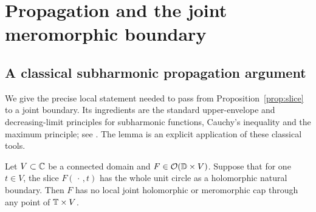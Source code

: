 \section{Propagation and the joint meromorphic boundary}
\label{sec:joint}

\subsection{A classical subharmonic propagation argument}

We give the precise local statement needed to pass from
Proposition~\ref{prop:slice} to a joint boundary. Its ingredients are
the standard upper-envelope and decreasing-limit principles for
subharmonic functions, Cauchy's inequality and the maximum principle;
see \citep[Section 4.8 and Properties 8.4.3]{kw2017}.
The lemma is an explicit application of these classical tools.

\begin{lemma}\label{lem:cap}
Let \(V\subset\mathbb C\) be a connected domain and
\(F\in\mathcal O(\mathbb D\times V)\). Suppose that for one \(t\in V\),
the slice \(F(\,\cdot\,,t)\) has the whole unit circle as a
holomorphic natural boundary. Then \(F\) has no local joint
holomorphic or meromorphic cap through any point of \(\mathbb T\times V\).
\end{lemma}

